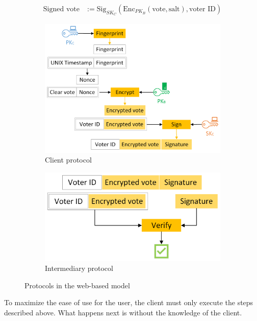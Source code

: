 \documentclass[a4paper,12pt,english]{article}
\begin{document}
\begin{align}
    \text{Signed vote} &:= \text{Sig}_{SK_C}(\text{Enc}_{PK_B}(\text{vote}, \text{salt}), \text{voter ID})\label{formula:signed_vote}
\end{align}

\begin{figure}
    \centering
    \begin{subfigure}{0.48\textwidth}
        \includegraphics[width=\textwidth]{Client_Protocol}
        \caption{Client protocol}\label{fig:client}
    \end{subfigure}
    \begin{subfigure}{0.48\textwidth}
        \includegraphics[width=\textwidth]{Intermediary_Protocol}
        \caption{Intermediary protocol}\label{fig:intermediary}
    \end{subfigure}
    \caption{Protocols in the web-based model}
\end{figure}

To maximize the ease of use for the user, the client must only execute the steps described above. What happens next is without the knowledge of the client.
\end{document}
